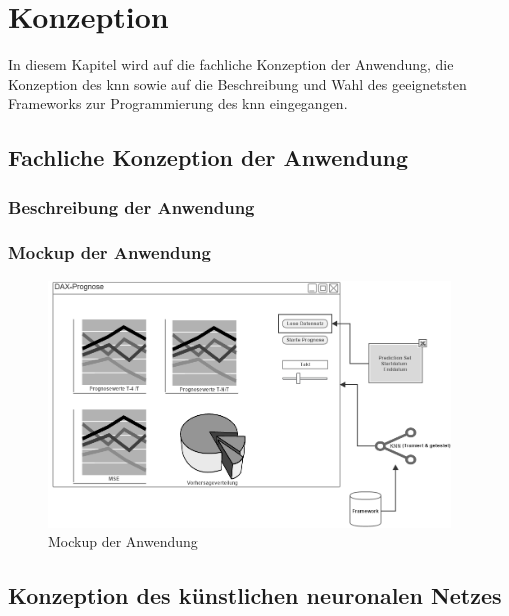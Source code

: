 \chapter{Konzeption}
\label{chapter:Konzeption}
In diesem Kapitel wird auf die fachliche Konzeption der Anwendung, die Konzeption des \ac{knn} sowie auf die Beschreibung und Wahl des geeignetsten Frameworks zur Programmierung des \ac{knn} eingegangen.

\section{Fachliche Konzeption der Anwendung} %
\label{section:Fachliche Konzeption der Anwendung} %

\subsection{Beschreibung der Anwendung} %
\label{subsection:Beschreibung der Anwendung} %

\subsection{Mockup der Anwendung} %
\label{subsection:Mockup der Anwendung} %

\begin{figure}[htbp]
\centering
		\includegraphics[width=0.95\textwidth]{mockup.PNG}
	\caption{Mockup der Anwendung}
	\label{fig:Mockup der Anwendung}
\end{figure}

\section{Konzeption des künstlichen neuronalen Netzes}
\label{section:Konzeption des künstlichen neuronalen Netzes}

